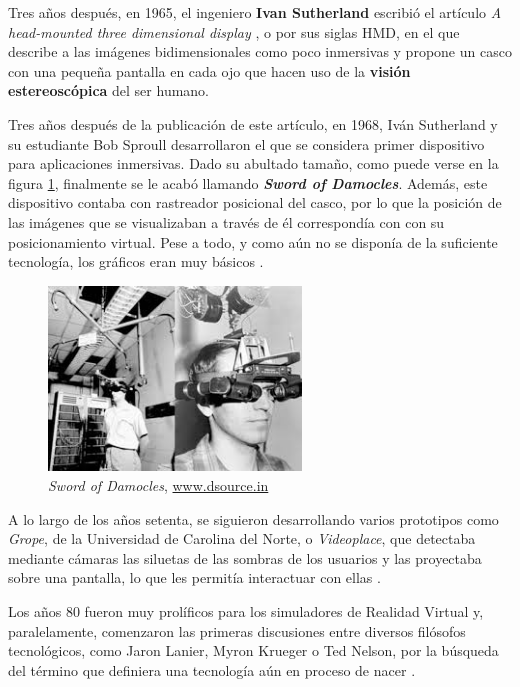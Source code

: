 Tres años después, en 1965, el ingeniero \textbf{Ivan Sutherland} escribió el artículo \textit{A head-mounted three dimensional display} \cite{suth-65}, o por sus siglas \acs{HMD}, en el que describe a las imágenes bidimensionales como poco inmersivas y propone un casco con una pequeña pantalla en cada ojo que hacen uso de la \textbf{visión estereoscópica} del ser humano.

Tres años después de la publicación de este artículo, en 1968, Iván Sutherland y su estudiante Bob Sproull desarrollaron el que se considera primer dispositivo para aplicaciones inmersivas. Dado su abultado tamaño, como puede verse en la figura \ref{fig:damocles}, finalmente se le acabó llamando \textbf{\textit{Sword of Damocles}}. Además, este dispositivo contaba con rastreador posicional del casco, por lo que la posición de las imágenes que se visualizaban a través de él correspondía con con su posicionamiento virtual. Pese a todo, y como aún no se disponía de la suficiente tecnología, los gráficos eran muy básicos \cite{lop-18}.

\vspace{0.1cm}

\begin{figure}[!h]
    \begin{center}
        \includegraphics[width=0.6\textwidth]{imagenes/2/damocles.jpg}
        \caption{\textit{Sword of Damocles}, \url{www.dsource.in}}
        \label{fig:damocles}
    \end{center}
\end{figure}

A lo largo de los años setenta, se siguieron desarrollando varios prototipos como \textit{Grope}, de la Universidad de Carolina del Norte, o \textit{Videoplace}, que detectaba mediante cámaras las siluetas de las sombras de los usuarios y las proyectaba sobre una pantalla, lo que les permitía interactuar con ellas \cite{gerv-99}.

Los años 80 fueron muy prolíficos para los simuladores de Realidad Virtual y, paralelamente, comenzaron las primeras discusiones entre diversos filósofos tecnológicos, como Jaron Lanier, Myron Krueger o Ted Nelson, por la búsqueda del término que definiera una tecnología aún en proceso de nacer \cite{lop-18}.

